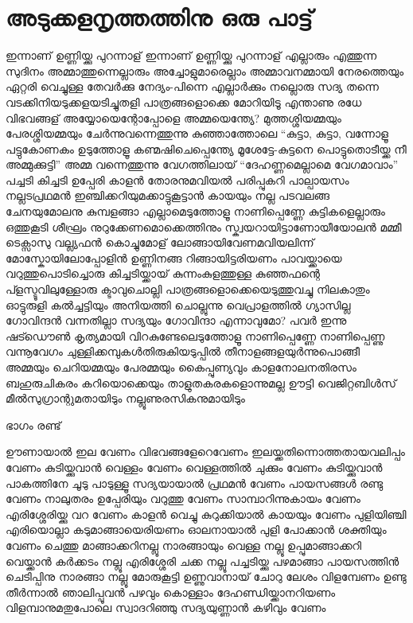\chapter{അടുക്കളനൃത്തത്തിനു ഒരു പാട്ട്}
\obeylines
\noindent
ഇന്നാണ്‌ ഉണ്ണിയ്ക്കു പുറന്നാള്‌
ഇന്നാണ്‌ ഉണ്ണിയ്ക്കു പുറന്നാള്‌
എല്ലാരും എത്തുന്ന സുദിനം
അമ്മാത്തുന്നെല്ലാരും അച്ചോളുമാരെല്ലാം
അമ്മാവനമ്മായി നേരത്തെയും
ഏറ്റരി വെച്ചുള്ള തേവർക്കു നേദ്യം-പിന്നെ
എല്ലാർക്കും നല്ലൊരു സദ്യ തന്നെ
വടക്കിനിയടുക്കളയടിച്ചുതളി
പാത്രങ്ങളൊക്കെ മോറിയിടൂ
എന്താണു രധേ വിഭവങ്ങള്‌
അയ്യോയെന്റോപ്പോളെ അമ്മയെന്ത്യേ?
മുത്തശ്ശിയമ്മയും പേരശ്ശിയമ്മയും
 ചേർന്നുവന്നെത്തുന്നു കുഞ്ഞാത്തോലെ
“കുട്ടാ, കുട്ടാ, വന്നോളൂ പട്ടുകോണകം ഉടുത്തോളൂ
കണ്മഷിചെപ്പെന്ത്യേ മൂശേട്ടേ-കുട്ടനെ
പൊട്ടുതൊടീയ്ക്ക നീ അമ്മുക്കുട്ടി”
അമ്മ വന്നെത്തുന്നു വേഗത്തിലായ്
“ദേഹണ്ണമെല്ലാമെ വേഗമാവാം”
പച്ചടി കിച്ചടി ഉപ്പേരി കാളൻ
തോരനുമവിയൽ പരിപ്പുകറി
പാല്പായസം നല്ലടപ്രഥമൻ
ഇഞ്ചിക്കറിയുമക്കാട്ടുകൂട്ടാൻ
കായയും നല്ല പടവലങ്ങ
ചേനയുമോലനു കുമ്പളങ്ങാ
എല്ലാമെടുത്തോളൂ നാണിപ്പെണ്ണേ
കുട്ടികളെല്ലാരും ഒത്തുകൂടി
ശീഘ്രം നുറുക്കേണമൊക്കെത്തിനും
സ്ക്വയറായിട്ടാണോയീയോലൻ മമ്മീ
ടെക്സാസു വല്ല്യഫൻ കൊച്ചുമോള്‌
ലോങ്ങായിവേണമവിയലിന്ന്
മോസ്കോയിലോപ്പോളിൻ ഉണ്ണിനങ്ങ
റിങ്ങായിട്ടരിയണം പാവയ്ക്കായെ
വറുത്തുപൊടിച്ചൊരു കിച്ചടിയ്ക്കായ്
കുന്നംകുളത്തുള്ള കുഞ്ഞഫന്റെ
പ്ളസ്ടൂവിലുള്ളോരു ക്ടാവുചൊല്ലി
പാത്രങ്ങളൊക്കെയെടുത്തുവച്ചു
നിലകാതും ഓട്ടുരുളി കൽച്ചട്ടിയും
അനിയത്തി ചൊല്ലുന്നു വെപ്രാളത്തിൽ
ഗ്യാസില്ല ഗോവിന്ദൻ വന്നതില്ലാ
സദ്യയും ഗോവിന്ദാ എന്നാവുമോ?
പവർ ഇന്നു ഷട്ഡൌൺ കൃത്യമായി
വിറകുണ്ടേലെടുത്തോളൂ നാണിപ്പെണ്ണേ
\hspace{2em}നാണിപ്പെണ്ണു വന്നൂവേഗം
\hspace{2em}ചുള്ളിക്കമ്പുകൾതിരുകിയടുപ്പിൽ
\hspace{2em}തീനാളങ്ങളയുർന്നുപൊങ്ങീ
അമ്മയും ചെറിയമ്മയും പേരമ്മയും കൈപ്പുണ്യവും
കാളനോലനതിരസം ബഹുരുചികരം കറിയൊക്കെയും
താളുതകരകളൊന്നുമല്ല ഊട്ടി വെജിറ്റബിൾസ്
മീൽസുഗ്രാന്റുമതായിടും
നല്ലൂണുരസികനുമായിടും

ഭാഗം രണ്ട്

ഊണായാൽ ഇല വേണം
വിഭവങ്ങളേറെവേണം
ഇലയ്ക്കതിന്നൊത്തതായവലിപ്പം വേണം
കുടിയ്ക്കുവാൻ വെള്ളം വേണം
വെള്ളത്തിൽ ചുക്കും വേണം
കുടിയ്ക്കുവാൻ പാകത്തിനേ ചൂടു പാടുള്ളൂ
സദ്യയായാൽ പ്രഥമൻ വേണം
പായസങ്ങൾ രണ്ടു വേണം
നാലുതരം ഉപ്പേരിയും വറുത്തു വേണം
സാമ്പാറിന്നുകായം വേണം
എരിശ്ശേരിയ്ക്കു വറ വേണം
കാളൻ വെച്ചു കുറുക്കിയാൽ കായയും വേണം
പുളിയിഞ്ചി എരിയൊല്ലാ
കടുമാങ്ങായെരിയണം
ഓലനായാൽ പുളി പോക്കാൻ ശക്തിയും വേണം
ചെത്തു മാങ്ങാക്കറിനല്ലൂ
നാരങ്ങായും വെള്ള നല്ലൂ
ഉപ്പുമാങ്ങാക്കറി വെയ്ക്കാൻ കർക്കടം നല്ലൂ
എരിശ്ശേരി ചക്ക നല്ലൂ
പച്ചടിയ്ക്കു പഴമാങ്ങാ
പായസത്തിൻ ചെടിപ്പിനു നാരങ്ങാ നല്ലൂ
മോരുകൂട്ടി ഉണ്ണുവാനായ്
ചോറു ലേശം വിളമ്പേണം
ഉണ്ടു തീർന്നാൽ ഞാലിപ്പൂവൻ പഴവും കൊള്ളാം
ദേഹണ്ഡിയ്ക്കാനറിയണം
വിളമ്പാനുമതുപോലെ
സ്വാദറിഞ്ഞു സദ്യയുണ്ണാൻ കഴിവും വേണം
